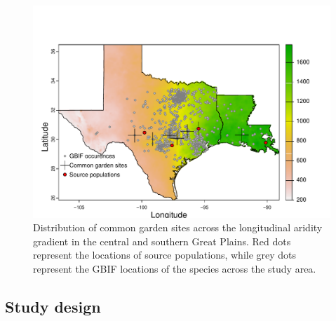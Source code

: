 \documentclass[11pt]{article}
\begin{document}
\begin{figure}[h!]
\includegraphics[width=1\textwidth]{clim_map_v1.pdf}
\caption{Distribution of common garden sites across the longitudinal aridity gradient in the central and southern Great Plains. 
Red dots represent the locations of source populations, while grey dots represent the GBIF locations of the species across the study area.}
\label{fig:site}
\end{figure}

\subsection*{Study design}
\end{document}
